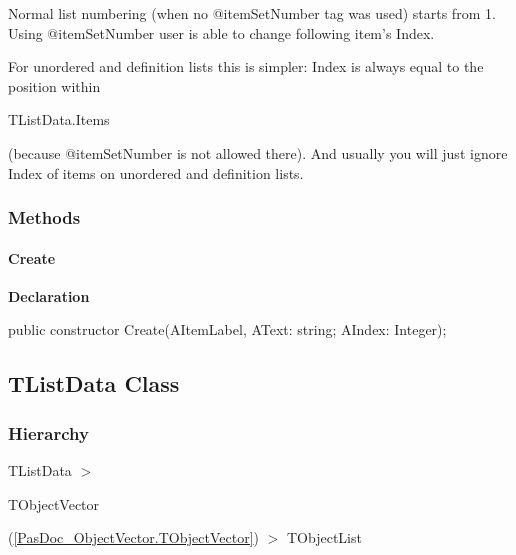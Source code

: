\documentclass{report}
\newif\ifpdf
\begin{document}
\begin{list}{}
Normal list numbering (when no @itemSetNumber tag was used) starts from 1. Using @itemSetNumber user is able to change following item's Index.

For unordered and definition lists this is simpler: Index is always equal to the position within \begin{ttfamily}TListData.Items\end{ttfamily} (because @itemSetNumber is not allowed there). And usually you will just ignore Index of items on unordered and definition lists.\end{list}
\subsubsection*{\large{\textbf{Methods}}\normalsize\hspace{1ex}\hfill}
\paragraph*{Create}\hspace*{\fill}

\label{PasDoc_Gen.TListItemData-Create}
\begin{list}{}{
\setlength{\itemindent}{0cm}
\setlength{\listparindent}{0cm}
\setlength{\leftmargin}{\evensidemargin}
\addtolength{\leftmargin}{\tmplength}
\settowidth{\labelsep}{X}
\addtolength{\leftmargin}{\labelsep}
\setlength{\labelwidth}{\tmplength}
}
\item[\textbf{Declaration}\hfill]
\ifpdf
\begin{flushleft}
\fi
\begin{ttfamily}
public constructor Create(AItemLabel, AText: string; AIndex: Integer);\end{ttfamily}

\ifpdf
\end{flushleft}
\fi

\end{list}
\ifpdf
\subsection*{\large{\textbf{TListData Class}}\normalsize\hspace{1ex}\hrulefill}
\else
\subsection*{TListData Class}
\fi
\label{PasDoc_Gen.TListData}
\subsubsection*{\large{\textbf{Hierarchy}}\normalsize\hspace{1ex}\hfill}
TListData {$>$} \begin{ttfamily}TObjectVector\end{ttfamily}(\ref{PasDoc_ObjectVector.TObjectVector}) {$>$} 
TObjectList
\end{document}
